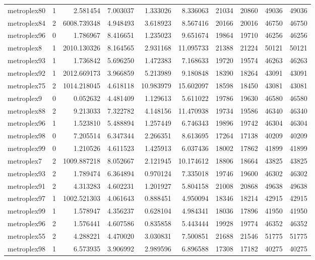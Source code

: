 \begin{longtable}{|l|r|r|r|r|r|r|r|r|r|}
metroplex80 & 1 & 2.581454 & 7.003037 & 1.333026 & 8.336063 & 21034 & 20860 & 49036 & 49036 \\
metroplex84 & 2 & 6008.739348 & 4.948493 & 3.618923 & 8.567416 & 20166 & 20016 & 46750 & 46750 \\
metroplex96 & 0 & 1.786967 & 8.416651 & 1.235023 & 9.651674 & 19864 & 19710 & 46256 & 46256 \\
metroplex8 & 1 & 2010.130326 & 8.164565 & 2.931168 & 11.095733 & 21388 & 21224 & 50121 & 50121 \\
metroplex93 & 1 & 1.736842 & 5.696250 & 1.472383 & 7.168633 & 19720 & 19574 & 46263 & 46263 \\
metroplex92 & 1 & 2012.669173 & 3.966859 & 5.213989 & 9.180848 & 18390 & 18264 & 43091 & 43091 \\
metroplex75 & 2 & 1014.218045 & 4.618118 & 10.983979 & 15.602097 & 18598 & 18450 & 43081 & 43081 \\
metroplex9 & 0 & 0.052632 & 4.481409 & 1.129613 & 5.611022 & 19786 & 19630 & 46580 & 46580 \\
metroplex88 & 2 & 9.213033 & 7.322782 & 4.148156 & 11.470938 & 19734 & 19586 & 46340 & 46340 \\
metroplex96 & 1 & 1.523810 & 5.488894 & 1.257449 & 6.746343 & 19896 & 19742 & 46304 & 46304 \\
metroplex98 & 0 & 7.205514 & 6.347344 & 2.266351 & 8.613695 & 17264 & 17138 & 40209 & 40209 \\
metroplex99 & 0 & 1.210526 & 4.611523 & 1.425913 & 6.037436 & 18002 & 17862 & 41899 & 41899 \\
metroplex7 & 2 & 1009.887218 & 8.052667 & 2.121945 & 10.174612 & 18806 & 18664 & 43825 & 43825 \\
metroplex93 & 2 & 1.789474 & 6.364894 & 0.970124 & 7.335018 & 19746 & 19600 & 46302 & 46302 \\
metroplex91 & 2 & 4.313283 & 4.602231 & 1.201927 & 5.804158 & 21008 & 20868 & 49638 & 49638 \\
metroplex97 & 1 & 1002.521303 & 4.061643 & 0.888451 & 4.950094 & 18346 & 18214 & 42915 & 42915 \\
metroplex99 & 1 & 1.578947 & 4.356237 & 0.628104 & 4.984341 & 18036 & 17896 & 41950 & 41950 \\
metroplex96 & 2 & 1.576441 & 4.607586 & 0.835858 & 5.443444 & 19928 & 19774 & 46352 & 46352 \\
metroplex55 & 2 & 4.288221 & 4.470020 & 3.030831 & 7.500851 & 21688 & 21546 & 51775 & 51775 \\
metroplex98 & 1 & 6.573935 & 3.906992 & 2.989596 & 6.896588 & 17308 & 17182 & 40275 & 40275 \\

\end{longtable}
